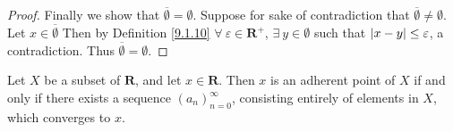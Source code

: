 \begin{proof}
    Finally we show that \(\overline{\emptyset} = \emptyset\).
    Suppose for sake of contradiction that \(\overline{\emptyset} \neq \emptyset\).
    Let \(x \in \overline{\emptyset}\)
    Then by Definition \ref{9.1.10} \(\forall\ \varepsilon \in \mathbf{R}^+\), \(\exists\ y \in \emptyset\) such that \(\abs*{x - y} \leq \varepsilon\), a contradiction.
    Thus \(\overline{\emptyset} = \emptyset\).
\end{proof}

\begin{lemma}\label{9.1.14}
    Let \(X\) be a subset of \(\mathbf{R}\), and let \(x \in \mathbf{R}\).
    Then \(x\) is an adherent point of \(X\) if and only if there exists a sequence \((a_n)_{n = 0}^\infty\), consisting entirely of elements in \(X\), which converges to \(x\).
\end{lemma}

